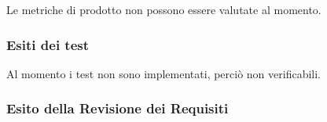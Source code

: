 	Le metriche di prodotto non possono essere valutate al momento.


\subsubsection{Esiti dei test}
	Al momento i test non sono implementati, perciò non verificabili. 
	
\subsubsection{Esito della Revisione dei Requisiti}
	
